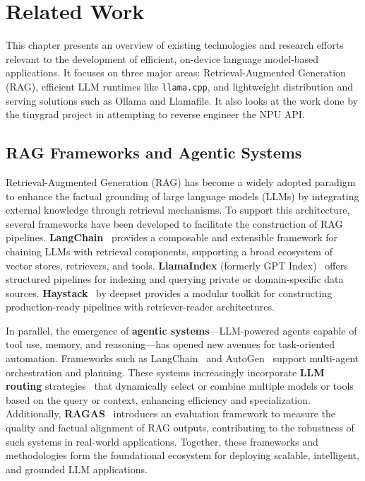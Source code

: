 \chapter{Related Work}
\label{ch:RelatedWork}

This chapter presents an overview of existing technologies and research efforts relevant to the development of efficient, on-device language model-based applications. It focuses on three major areas: Retrieval-Augmented Generation (RAG), efficient LLM runtimes like \texttt{llama.cpp}, and lightweight distribution and serving solutions such as Ollama and Llamafile. It also looks at the work done by the tinygrad project in attempting to reverse engineer the NPU API.


\section{RAG Frameworks and Agentic Systems}
\label{sec:RAG}

Retrieval-Augmented Generation (RAG) has become a widely adopted paradigm to enhance the factual grounding of large language models (LLMs) by integrating external knowledge through retrieval mechanisms. To support this architecture, several frameworks have been developed to facilitate the construction of RAG pipelines. \textbf{LangChain}~\cite{langchain} provides a composable and extensible framework for chaining LLMs with retrieval components, supporting a broad ecosystem of vector stores, retrievers, and tools. \textbf{LlamaIndex} (formerly GPT Index)~\cite{llamaindex} offers structured pipelines for indexing and querying private or domain-specific data sources. \textbf{Haystack}~\cite{haystack} by deepset provides a modular toolkit for constructing production-ready pipelines with retriever-reader architectures.

In parallel, the emergence of \textbf{agentic systems}—LLM-powered agents capable of tool use, memory, and reasoning—has opened new avenues for task-oriented automation. Frameworks such as LangChain~\cite{langchain} and AutoGen~\cite{autogen} support multi-agent orchestration and planning. These systems increasingly incorporate \textbf{LLM routing} strategies~\cite{gor2023router} that dynamically select or combine multiple models or tools based on the query or context, enhancing efficiency and specialization. Additionally, \textbf{RAGAS}~\cite{ragas} introduces an evaluation framework to measure the quality and factual alignment of RAG outputs, contributing to the robustness of such systems in real-world applications. Together, these frameworks and methodologies form the foundational ecosystem for deploying scalable, intelligent, and grounded LLM applications.


